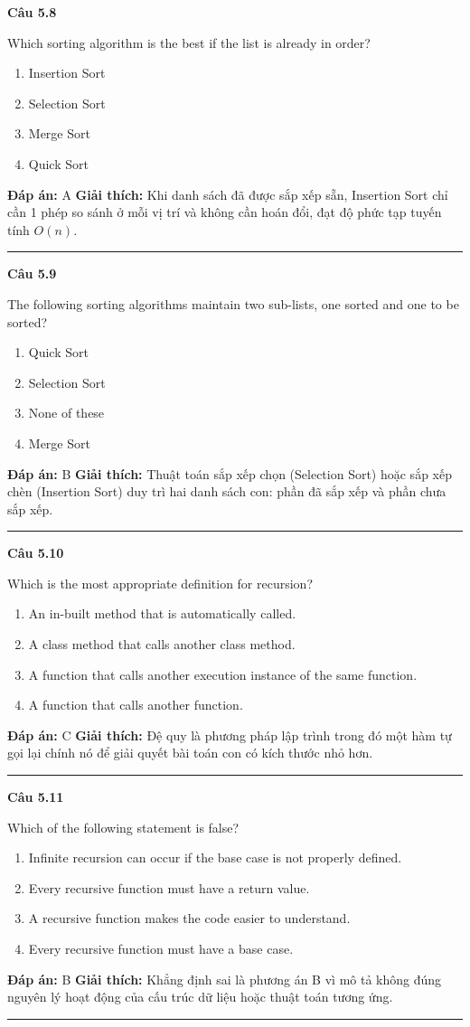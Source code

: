 \documentclass[11pt,a4paper]{article}
\newenvironment{question}[1]{%
  \par\vspace{1em}\noindent\textbf{\large Câu #1}\par\vspace{0.4em}
}{%
  \par\vspace{1em}\hrule\vspace{0.6em}
}
\newenvironment{choices}{%
  \begin{enumerate}[label=\textbf{\Alph*.},leftmargin=2.2em,itemsep=2pt,topsep=3pt]
}{%
  \end{enumerate}
}
\newcommand{\choice}{\item}
\begin{document}
\begin{question}{5.8}
Which sorting algorithm is the best if the list is already in order?
\begin{choices}
\choice Insertion Sort
\choice Selection Sort
\choice Merge Sort
\choice Quick Sort
\end{choices}
\textbf{Đáp án:} A
\textbf{Giải thích:} Khi danh sách đã được sắp xếp sẵn, Insertion Sort chỉ cần 1 phép so sánh ở mỗi vị trí và không cần hoán đổi, đạt độ phức tạp tuyến tính $O(n)$.
\end{question}

\begin{question}{5.9}
The following sorting algorithms maintain two sub-lists, one sorted and one to be sorted?
\begin{choices}
\choice Quick Sort
\choice Selection Sort
\choice None of these
\choice Merge Sort
\end{choices}
\textbf{Đáp án:} B
\textbf{Giải thích:} Thuật toán sắp xếp chọn (Selection Sort) hoặc sắp xếp chèn (Insertion Sort) duy trì hai danh sách con: phần đã sắp xếp và phần chưa sắp xếp.
\end{question}

\begin{question}{5.10}
Which is the most appropriate definition for recursion?
\begin{choices}
\choice An in-built method that is automatically called.
\choice A class method that calls another class method.
\choice A function that calls another execution instance of the same function.
\choice A function that calls another function.
\end{choices}
\textbf{Đáp án:} C
\textbf{Giải thích:} Đệ quy là phương pháp lập trình trong đó một hàm tự gọi lại chính nó để giải quyết bài toán con có kích thước nhỏ hơn.
\end{question}

\begin{question}{5.11}
Which of the following statement is false?
\begin{choices}
\choice Infinite recursion can occur if the base case is not properly defined.
\choice Every recursive function must have a return value.
\choice A recursive function makes the code easier to understand.
\choice Every recursive function must have a base case.
\end{choices}
\textbf{Đáp án:} B
\textbf{Giải thích:} Khẳng định sai là phương án B vì mô tả không đúng nguyên lý hoạt động của cấu trúc dữ liệu hoặc thuật toán tương ứng.
\end{question}
\end{document}
